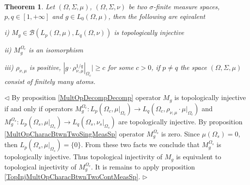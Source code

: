 \documentclass[12pt]{article}
\newtheorem{theorem}{Theorem}[subsection]
\newenvironment{proof}{\par $\triangleleft$}{$\triangleright$}
\begin{document}
\begin{theorem}\label{TopInjMultOpCharacBtwnTwoMeasSp} Let $(\Omega,\Sigma,\mu)$, $(\Omega,\Sigma,\nu)$ be two $\sigma$-finite measure spaces, $p,q\in[1,+\infty]$ and $g\in L_0(\Omega,\mu)$, then the following are eqivalent

i) $M_g\in\mathcal{B}(L_p(\Omega,\mu), L_q(\Omega,\nu))$ is topologically injective

ii) $M_g^{\Omega_c}$ is an isomorphism

iii) $\rho_{\nu,\mu}$ is positive, $|g\cdot\rho_{\nu,\mu}^{1/q}|_{\Omega_c}|\geq c$ for some $c>0$, if $p\neq q$ the space $(\Omega,\Sigma,\mu)$ consist of finitely many atoms.
\end{theorem}
\begin{proof}
By proposition \ref{MultOpDecompDecomp} operator $M_g$ is topologically injective if and only if operators $M_g^{\Omega_c}:L_p(\Omega_c,\mu|_{\Omega_c})\to L_q(\Omega_c,\rho_{\nu,\mu}\cdot\mu|_{\Omega_c})$ and $M_g^{\Omega_s}:L_p(\Omega_s,\mu|_{\Omega_s})\to L_q(\Omega_s,\nu_s|_{\Omega_s})$ are topologically injective. By proposition \ref{MultOpCharacBtwnTwoSingMeasSp} operator $M_g^{\Omega_s}$ is zero. Since $\mu(\Omega_s)=0$, then $L_p(\Omega_s,\mu|_{\Omega_s})=\{0\}$. From these two facts we conclude that $M_g^{\Omega_s}$ is topologically injective. Thus topological injectivity of $M_g$ is equivalent to topological injectivity of  $M_g^{\Omega_c}$. It is remains to apply proposition \ref{TopInjMultOpCharacBtwnTwoContMeasSp}.
\end{proof}
\end{document}
